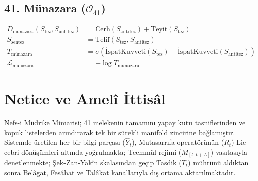 \documentclass[11pt, a4paper]{article}
\begin{document}
\subsection{41. Münazara ($\mathcal{O}_{41}$)}
\begin{align}
D_{\text{münazara}}(S_{\text{tez}}, S_{\text{antitez}}) &= \text{Cerh}(S_{\text{antitez}}) + \text{Teyit}(S_{\text{tez}}) \\
S_{\text{sentez}} &= \text{Telif}(S_{\text{tez}}, S_{\text{antitez}}) \\
T_{\text{münazara}} &= \sigma\left( \text{İspatKuvveti}(S_{\text{tez}}) - \text{İspatKuvveti}(S_{\text{antitez}}) \right) \\
\mathcal{L}_{\text{münazara}} &= -\log T_{\text{münazara}}
\end{align}

\section{Netice ve Amelî İttisâl}

Nefs-i Müdrike Mimarisi; 41 melekenin tamamını yapay kutu tasniflerinden ve kopuk listelerden arındırarak tek bir sürekli manifold zincirine bağlamıştır. Sistemde üretilen her bir bilgi parçası ($\hat{Y}_t$), Mutasarrıfa operatörünün ($R_t$) Lie cebri dönüşümleri altında yoğrulmakta; Teemmül rejimi ($M_{[t:t+L]}$) vasıtasıyla denetlenmekte; Şek-Zan-Yakîn skalasından geçip Tasdik ($T_t$) mührünü aldıktan sonra Belâgat, Fesâhat ve Talâkat kanallarıyla dış ortama aktarılmaktadır.
\end{document}
